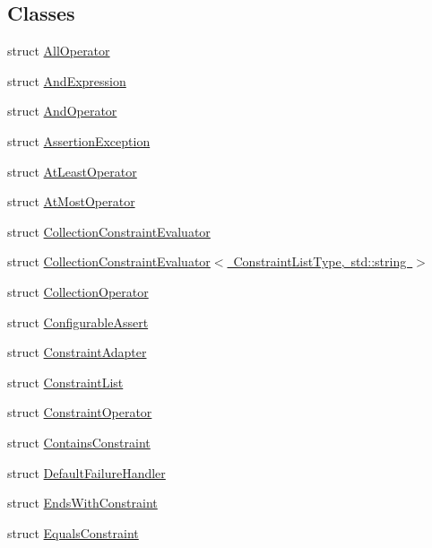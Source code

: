 \subsection*{Classes}
\begin{DoxyCompactItemize}
\item 
struct \mbox{\hyperlink{structsnowhouse_1_1AllOperator}{All\+Operator}}
\item 
struct \mbox{\hyperlink{structsnowhouse_1_1AndExpression}{And\+Expression}}
\item 
struct \mbox{\hyperlink{structsnowhouse_1_1AndOperator}{And\+Operator}}
\item 
struct \mbox{\hyperlink{structsnowhouse_1_1AssertionException}{Assertion\+Exception}}
\item 
struct \mbox{\hyperlink{structsnowhouse_1_1AtLeastOperator}{At\+Least\+Operator}}
\item 
struct \mbox{\hyperlink{structsnowhouse_1_1AtMostOperator}{At\+Most\+Operator}}
\item 
struct \mbox{\hyperlink{structsnowhouse_1_1CollectionConstraintEvaluator}{Collection\+Constraint\+Evaluator}}
\item 
struct \mbox{\hyperlink{structsnowhouse_1_1CollectionConstraintEvaluator_3_01ConstraintListType_00_01std_1_1string_01_4}{Collection\+Constraint\+Evaluator$<$ Constraint\+List\+Type, std\+::string $>$}}
\item 
struct \mbox{\hyperlink{structsnowhouse_1_1CollectionOperator}{Collection\+Operator}}
\item 
struct \mbox{\hyperlink{structsnowhouse_1_1ConfigurableAssert}{Configurable\+Assert}}
\item 
struct \mbox{\hyperlink{structsnowhouse_1_1ConstraintAdapter}{Constraint\+Adapter}}
\item 
struct \mbox{\hyperlink{structsnowhouse_1_1ConstraintList}{Constraint\+List}}
\item 
struct \mbox{\hyperlink{structsnowhouse_1_1ConstraintOperator}{Constraint\+Operator}}
\item 
struct \mbox{\hyperlink{structsnowhouse_1_1ContainsConstraint}{Contains\+Constraint}}
\item 
struct \mbox{\hyperlink{structsnowhouse_1_1DefaultFailureHandler}{Default\+Failure\+Handler}}
\item 
struct \mbox{\hyperlink{structsnowhouse_1_1EndsWithConstraint}{Ends\+With\+Constraint}}
\item 
struct \mbox{\hyperlink{structsnowhouse_1_1EqualsConstraint}{Equals\+Constraint}}
\item 

\end{DoxyCompactItemize}
